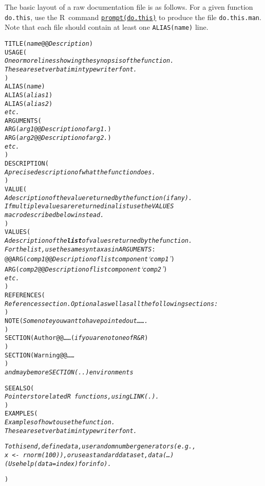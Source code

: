 \documentclass[a4paper,11pt]{article}
\newenvironment{display}[0]%
 {\begin{list}{}{\setlength{\leftmargin}{30pt}}\item}%
 {\end{list}}
\newcommand{\R}{\textsc{R}}
\begin{document}
The basic layout of a raw documentation file is as follows.
For a given function \texttt{do.this}, use the \R\ command
\underline{\texttt{prompt(do.this)}} to produce the file \texttt{do.this.man}.
Note that each file should contain at least one \texttt{ALIAS(name)} line.
\begin{display}
\begin{alltt}
TITLE(\textit{name} @@ \textit{Description})
USAGE(
\textit{One or more lines showing the synopsis of the function.
These are set verbatim in typewriter font.}
)
ALIAS(\textit{name})
ALIAS(\textit{alias 1})
ALIAS(\textit{alias 2})
\textit{etc.}
ARGUMENTS(
ARG(\textit{arg1} @@ \textit{Description of arg1.})
ARG(\textit{arg2} @@ \textit{Description of arg2.})
\textit{etc.}
)
DESCRIPTION(
\textit{A precise description of what the function does.}
)
VALUE(
\textit{A description of the value returned by the function (if any).
If multiple values are returned in a list use the \texttt{VALUES}
macro described below instead.}
)
VALUES(
{\textit{A description of the \textbf{list} of values returned by the function.
For the list, use the same syntax as in ARGUMENTS}:
@@\samepage}\pagebreak[3]
ARG(\textit{comp1} @@ \textit{Description of list component `comp1'})
ARG(\textit{comp2} @@ \textit{Description of list component `comp2'})
\textit{etc.}
)
REFERENCES(
\textit{References section.  Optional as well as all the following sections:}
)
NOTE( \textit{Some note you want to have pointed out\dots\dots.}
)
SECTION(Author @@ \dots\dots {\small(\textit{if you are not one of R\&R})}
)
SECTION(Warning @@ \textit{\dots\dots}
)
\textit{ and maybe more \texttt{SECTION(..)}  environments}

SEEALSO(
\textit{Pointers to related \R\ functions, using \texttt{LINK(.)}.}
)
EXAMPLES(
\textit{Examples of how to use the function.
These are set verbatim in typewriter font.}

\textit{To this end, define data, use random number generators (e.g.,
  \texttt{x <- rnorm(100)}), or use a standard dataset, \texttt{data(\dots)}
  (Use \texttt{help(data=index)} for info).}

)
\end{alltt}
\end{display}

\bigskip
\pagebreak[3]
\end{document}
